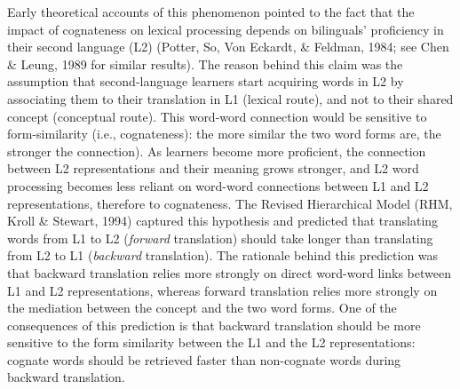 \documentclass[
  english,
  man,floatsintext]{apa6}
\begin{document}
Early theoretical accounts of this phenomenon pointed to the fact that the impact of cognateness on lexical processing depends on bilinguals' proficiency in their second language (L2) (Potter, So, Von Eckardt, \& Feldman, 1984; see Chen \& Leung, 1989 for similar results). The reason behind this claim was the assumption that second-language learners start acquiring words in L2 by associating them to their translation in L1 (lexical route), and not to their shared concept (conceptual route). This word-word connection would be sensitive to form-similarity (i.e., cognateness): the more similar the two word forms are, the stronger the connection). As learners become more proficient, the connection between L2 representations and their meaning grows stronger, and L2 word processing becomes less reliant on word-word connections between L1 and L2 representations, therefore to cognateness. The Revised Hierarchical Model (RHM, Kroll \& Stewart, 1994) captured this hypothesis and predicted that translating words from L1 to L2 (\emph{forward} translation) should take longer than translating from L2 to L1 (\emph{backward} translation). The rationale behind this prediction was that backward translation relies more strongly on direct word-word links between L1 and L2 representations, whereas forward translation relies more strongly on the mediation between the concept and the two word forms. One of the consequences of this prediction is that backward translation should be more sensitive to the form similarity between the L1 and the L2 representations: cognate words should be retrieved faster than non-cognate words during backward translation.
\end{document}
